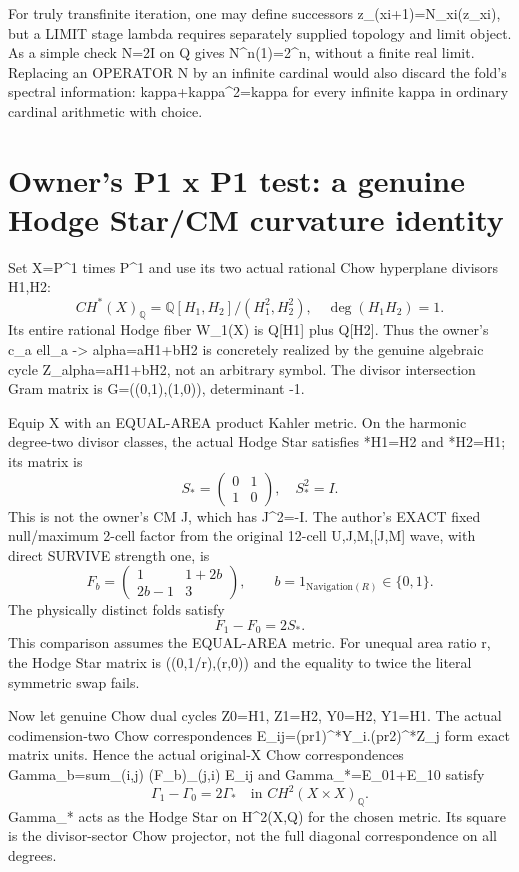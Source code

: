 \documentclass[11pt]{article}
\begin{document}
For truly transfinite iteration, one may define
successors z_(xi+1)=N_xi(z_xi), but a LIMIT stage
lambda requires separately supplied topology and
limit object. As a simple check N=2I on Q gives
N^n(1)=2^n, without a finite real limit.
Replacing an OPERATOR N by an infinite cardinal
would also discard the fold's spectral information:
kappa+kappa^2=kappa for every infinite kappa
in ordinary cardinal arithmetic with choice.

\section{Owner's P1 x P1 test: a genuine Hodge Star/CM curvature identity}
Set X=P^1 times P^1 and use its two actual
rational Chow hyperplane divisors H1,H2:
\[
CH^*(X)_{\mathbb Q}
=\mathbb Q[H_1,H_2]/(H_1^2,H_2^2),\quad
\deg(H_1H_2)=1.
\]
Its entire rational Hodge fiber W_1(X)
is Q[H1] plus Q[H2]. Thus the owner's
c_a ell_a -> alpha=aH1+bH2 is concretely
realized by the genuine algebraic cycle
Z_alpha=aH1+bH2, not an arbitrary symbol.
The divisor intersection Gram matrix is
G=((0,1),(1,0)), determinant -1.

Equip X with an EQUAL-AREA product Kahler metric.
On the harmonic degree-two divisor classes,
the actual Hodge Star satisfies
*H1=H2 and *H2=H1; its matrix is
\[
S_*=\begin{pmatrix}0&1\\1&0\end{pmatrix},\quad S_*^2=I.
\]
This is not the owner's CM J, which has J^2=-I.
The author's EXACT fixed null/maximum 2-cell factor
from the original 12-cell U,J,M,[J,M] wave,
with direct SURVIVE strength one, is
\[
F_b=\begin{pmatrix}1&1+2b\\2b-1&3\end{pmatrix},
\qquad b=1_{\mathrm{Navigation}(R)}\in\{0,1\}.
\]
The physically distinct folds satisfy
\[
\boxed{F_1-F_0=2S_*.}
\]
This comparison assumes the EQUAL-AREA metric.
For unequal area ratio r, the Hodge Star
matrix is ((0,1/r),(r,0)) and the equality
to twice the literal symmetric swap fails.

Now let genuine Chow dual cycles
Z0=H1, Z1=H2, Y0=H2, Y1=H1.
The actual codimension-two Chow correspondences
E_ij=(pr1)^*Y_i.(pr2)^*Z_j
form exact matrix units. Hence the actual
original-X Chow correspondences
Gamma_b=sum_(i,j) (F_b)_(j,i) E_ij
and Gamma_*=E_01+E_10 satisfy
\[
\boxed{\Gamma_1-\Gamma_0=2\Gamma_*
\quad\text{in }CH^2(X\times X)_{\mathbb Q}.}
\]
Gamma_* acts as the Hodge Star on H^2(X,Q)
for the chosen metric. Its square is the
divisor-sector Chow projector, not the full
diagonal correspondence on all degrees.
\end{document}
